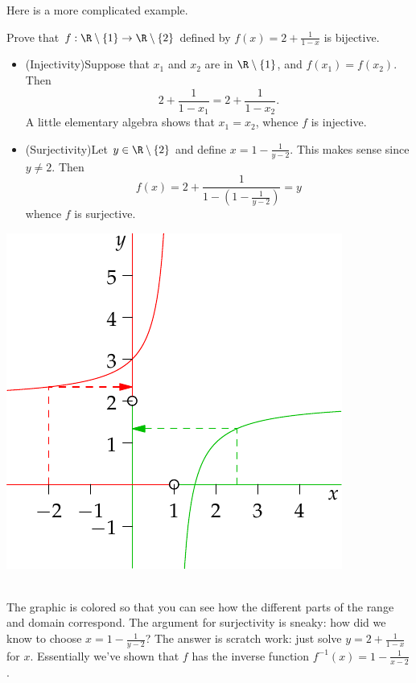 Here is a more complicated example.
\begin{example}
Prove that $f:\R\setminus\{1\}\to\R\setminus\{2\}$ defined by $f(x)=2+\frac 1{1-x}$ is bijective.\\[2pt]

\noindent\begin{minipage}{0.6\textwidth}
		\begin{itemize}
  	  \item[](Injectivity)\quad Suppose that $x_1$ and $x_2$ are in $\R\setminus\{1\}$, and $f(x_1)=f(x_2)$. Then
			\[2+\frac 1{1-x_1}=2+\frac 1{1-x_2}.\]
			A little elementary algebra shows that $x_1=x_2$, whence $f$ is injective.
  	  \item[](Surjectivity)\quad Let $y\in\R\setminus\{2\}$ and define $x=1-\frac 1{y-2}$. This makes sense since $y\neq 2$. Then
  	  \[f(x)=2+\frac 1{1-(1-\frac 1{y-2})}=y\]
  	  whence $f$ is surjective.
		\end{itemize}
  \end{minipage}\qquad
  \begin{minipage}{0.35\textwidth}
  	\includegraphics[width=\textwidth]{sets-09-bij}
  \end{minipage}\\[2pt]
The graphic is colored so that you can see how the different parts of the range and domain correspond. The argument for surjectivity is sneaky: how did we know to choose $x=1-\frac 1{y-2}$? The answer is scratch work: just solve $y=2+\frac 1{1-x}$ for $x$. Essentially we've shown that $f$ has the inverse function $f^{-1}(x)=1-\frac 1{x-2}$.
\end{example}

